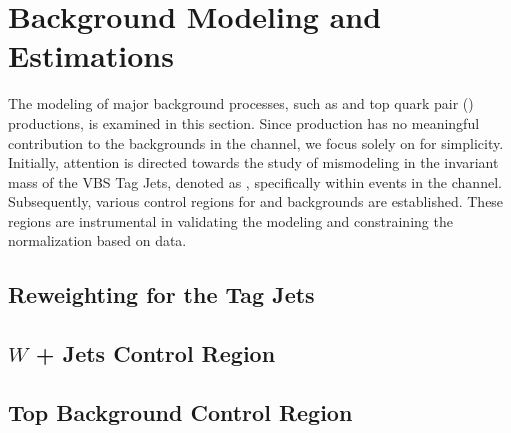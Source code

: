 \chapter{Background Modeling and Estimations}

The modeling of major background processes, such as \Wjets and top quark pair (\ttbar) productions, is examined in this section. 
Since \Zjets production has no meaningful contribution to the \Vjets backgrounds in the \olep channel, we focus solely on \Wjets for simplicity. 
Initially, attention is directed towards the study of mismodeling in the invariant mass of the VBS Tag Jets, denoted as \mjjtag, specifically within \Wjets events in the \olep channel. 
Subsequently, various control regions for \Wjets and \ttbar backgrounds are established. These regions are instrumental in validating the modeling and constraining the normalization based on data.

\section{Reweighting for the Tag Jets}

\clearpage
\section{\( W \) + Jets Control Region}

\clearpage
\section{Top Background Control Region}

